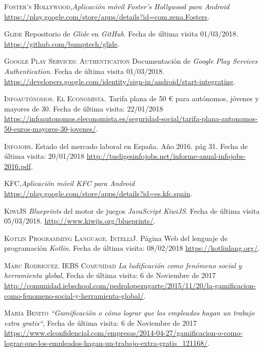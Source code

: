 \documentclass[twoside]{report}
\begin{document}
\begin{thebibliography}{a}
 \textsc{Foster's Hollywood},\textit{Aplicación móvil Foster's Hollywood para Android} \url{https://play.google.com/store/apps/details?id=com.zena.Fosters}.

 \textsc{Glide} 
Repositorio de \textit{Glide} en \textit{GitHub}. Fecha de última visita 01/03/2018. \url{https://github.com/bumptech/glide}.

 \textsc{Google Play Services: Authentication} 
Documentación de \textit{Google Play Services Authentication}. Fecha de última visita 01/03/2018. \url{https://developers.google.com/identity/sign-in/android/start-integrating}.

 \textsc{Infoautónomos. El Economista}. Tarifa plana de 50 \euro \hspace{0.1cm} para autónomos, jóvenes y mayores de 30. Fecha de última visita: 22/01/2018 \url{https://infoautonomos.eleconomista.es/seguridad-social/tarifa-plana-autonomos-50-euros-mayores-30-jovenes/}.

 \textsc{Infojobs}. Estado del mercado laboral en España. Año 2016. pág 31. Fecha de última visita: 20/01/2018 \url{http://tueligesinfojobs.net/informe-anual-infojobs-2016.pdf}.

 \textsc{KFC},\textit{Aplicación móvil KFC para \textit{Android}} \url{https://play.google.com/store/apps/details?id=es.kfc.spain}.

 \textsc{KiwiJS} 
\textit{Blueprints} del motor de juegos \textit{JavaScript KiwiJS}. Fecha de última visita 05/03/2018. \url{http://www.kiwijs.org/blueprints/}.

 \textsc{Kotlin Programming Language. IntelliJ}. Página Web del lenguaje de programación \textit{Kotlin}. Fecha de última visita: 08/02/2018 \url{https://kotlinlang.org/}.

 \textsc{Marc Rodríguez. IEBS Comunidad} \textit{La ludificación como fenómeno social y herramienta global}, Fecha de última visita: 6 de Noviembre de 2017 \url{http://comunidad.iebschool.com/pedrolopezugarte/2015/11/20/la-gamificacion-como-fenomeno-social-y-herramienta-global/}.  

 \textsc{María Benito} \textit{“Gamificación o cómo lograr que los empleados hagan un trabajo extra gratis“}, Fecha de última visita: 6 de Noviembre de 2017 \url{https://www.elconfidencial.com/empresas/2014-04-27/gamificacion-o-como-lograr-que-los-empleados-hagan-un-trabajo-extra-gratis_121168/}. 


\end{thebibliography}
\end{document}

